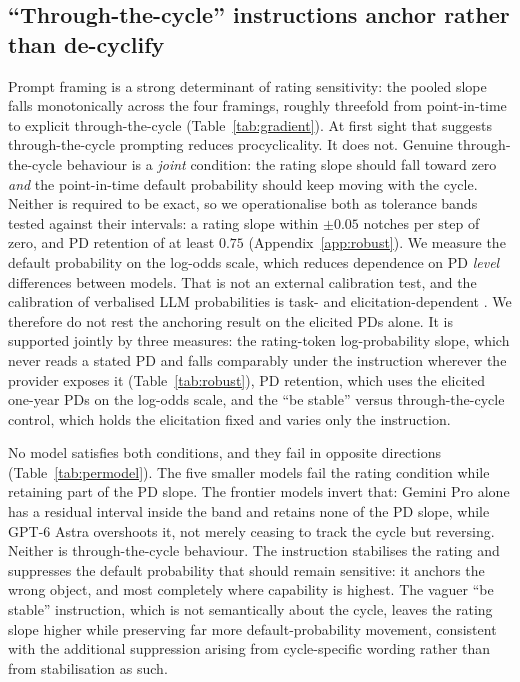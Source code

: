 \documentclass[a4paper,fleqn]{cas-sc}
\begin{document}
\subsection{``Through-the-cycle'' instructions anchor rather than de-cyclify}\label{sec:ttc}
Prompt framing is a strong determinant of rating sensitivity: the pooled slope falls monotonically
across the four framings, roughly threefold from point-in-time to explicit through-the-cycle
(Table~\ref{tab:gradient}). At first sight that suggests through-the-cycle prompting reduces
procyclicality. It does not. Genuine through-the-cycle behaviour is a \emph{joint} condition: the rating slope should
fall toward zero \emph{and} the point-in-time default probability should keep moving with the cycle.
Neither is required to be exact, so we operationalise both as tolerance bands tested against
their intervals: a rating slope within $\pm0.05$ notches per step of zero, and PD retention of at
least $0.75$ (Appendix~\ref{app:robust}). We measure the default probability on the
log-odds scale, which reduces dependence on PD \emph{level} differences between models. That is not an external calibration test, and the calibration of verbalised LLM probabilities is task- and elicitation-dependent \citep{kadavath2022}. We therefore do not rest the anchoring result on the
elicited PDs alone. It is supported jointly by three measures: the rating-token log-probability slope,
which never reads a stated PD and falls comparably under the instruction wherever the provider exposes it (Table~\ref{tab:robust}), PD retention, which uses the elicited one-year PDs on
the log-odds scale, and the ``be stable'' versus through-the-cycle control, which holds the elicitation fixed and varies
only the instruction.

No model satisfies both conditions, and they fail in opposite directions
(Table~\ref{tab:permodel}). The five smaller models fail the rating condition while retaining part of
the PD slope. The frontier models invert that: Gemini Pro alone has a residual interval inside the band and retains
none of the PD slope, while GPT-6 Astra overshoots it, not merely ceasing to track the cycle but
reversing. Neither is through-the-cycle behaviour. The instruction stabilises the rating and suppresses the
default probability that should remain sensitive: it anchors the wrong object, and most completely
where capability is highest. The vaguer ``be stable'' instruction, which is not semantically about the
cycle, leaves the rating slope higher while preserving far more default-probability
movement, consistent with the additional suppression arising from cycle-specific wording rather than from stabilisation as such.
\end{document}
